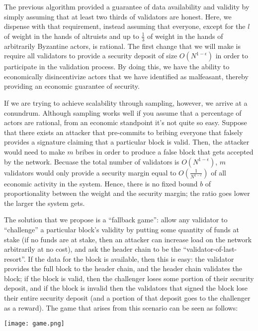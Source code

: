 \documentclass[11pt,a4paper]{report}
\theoremstyle{plain}
\theoremstyle{definition}
\theoremstyle{remark}
\begin{document}
The previous algorithm provided a guarantee of data availability and validity by simply assuming that at least two thirds of validators are honest. Here, we dispense with that requirement, instead assuming that everyone, except for the $l$ of weight in the hands of altruists and up to $\frac{1}{3}$ of weight in the hands of arbitrarily Byzantine actors, is rational. The first change that we will make is require all validators to provide a security deposit of size $O(N^{1-\epsilon})$ in order to participate in the validation process. By doing this, we have the ability to economically disincentivize actors that we have identified as malfeasant, thereby providing an economic guarantee of security.

If we are trying to achieve scalability through sampling, however, we arrive at a conundrum. Although sampling works well if you assume that a percentage of actors are rational, from an economic standpoint it's not quite so easy. Suppose that there exists an attacker that pre-commits to bribing everyone that falsely provides a signature claiming that a particular block is valid. Then, the attacker would need to make $m$ bribes in order to produce a false block that gets accepted by the network. Becuase the total number of validators is $O(N^{1-\epsilon})$, $m$ validators would only provide a security margin equal to $O(\frac{1}{N^{1-\epsilon}})$ of all economic activity in the system. Hence, there is no fixed bound $b$ of proportionality between the weight and the security margin; the ratio goes lower the larger the system gets.

The solution that we propose is a ``fallback game'': allow any validator to ``challenge'' a particular block's validity by putting some quantity of funds at stake (if no funds are at stake, then an attacker can increase load on the network arbitrarily at no cost), and ask the header chain to be the ``validator-of-last-resort''. If the data for the block is available, then this is easy: the validator provides the full block to the header chain, and the header chain validates the block; if the block is valid, then the challenger loses some portion of their security deposit, and if the block is invalid then the validators that signed the block lose their entire security deposit (and a portion of that deposit goes to the challenger as a reward). The game that arises from this scenario can be seen as follows:

\begin{center}
\texttt{[image: game.png]}
\end{center}
\end{document}
